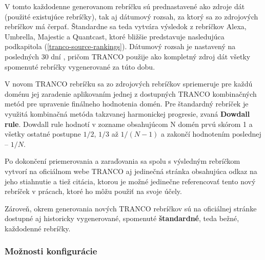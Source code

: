 V tomto každodenne generovanom rebríčku sú prednastavené ako zdroje dát (použité existujúce rebríčky), tak aj dátumový rozsah, za ktorý sa zo zdrojových rebríčkov má čerpať.
Štandardne sa teda vytvára výsledok z rebríčkov Alexa, Umbrella, Majestic a Quantcast, ktoré bližšie predstavuje nasledujúca podkapitola (\ref{tranco-source-rankings}). 
Dátumový rozsah je nastavený na posledných 30 dní \cite{tranco-github}, pričom TRANCO použije ako kompletný zdroj dát všetky spomenuté rebríčky vygenerované za túto dobu. 

V novom TRANCO rebríčku sa zo zdrojových rebríčkov spriemeruje pre každú doménu jej zaradenie aplikovaním jednej z dostupných TRANCO kombinačných metód pre upravenie finálneho hodnotenia domén.
Pre štandardný rebríček je využitá kombinačná metóda takzvanej harmonickej progresie, zvaná \textbf{Dowdall rule}. Dowdall rule hodnotí v zozname obsahujúcom N domén prvú skórom 1 a všetky ostatné postupne \(1/2\), \(1/3\) až \(1/(N-1)\) a zakončí hodnotením poslednej -- \(1/N\).\cite{tranco}\cite{tranco-homepage}

Po dokončení priemerovania a zaraďovania sa spolu s výsledným rebríčkom vytvorí na oficiálnom webe TRANCO aj jedinečná stránka obsahujúca odkaz na jeho stiahnutie a tiež citácia, 
ktorou je možné jedinečne referencovať tento nový rebríček v prácach, ktoré ho môžu použiť na svoje účely.

Zároveň, okrem generovania nových TRANCO rebríčkov sú na oficiálnej stránke dostupné aj historicky vygenerované, spomenuté \textbf{štandardné}, teda bežné, každodenné rebríčky. \cite{tranco-homepage}

\subsubsection{Možnosti konfigurácie}
\label{tranco-config}


